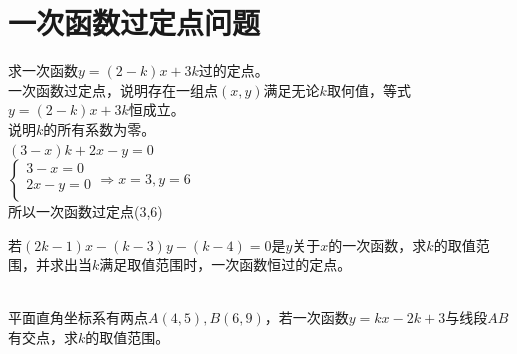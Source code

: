 \section{一次函数过定点问题}
\begin{example}
    求一次函数$y=(2-k)x+3k$过的定点。 \\
    一次函数过定点，说明存在一组点$(x,y)$满足无论$k$取何值，等式$y=(2-k)x+3k$恒成立。 \\
    说明$k$的所有系数为零。 \\
    $(3-x)k+2x-y=0$ \\
    $\begin{cases} 3-x=0 \\ 2x-y=0 \\ \end{cases} \Rightarrow x=3,y=6$ \\
    所以一次函数过定点(3,6)
\end{example}
\begin{problem}
若$(2k−1)x−(k−3)y−(k−4)=0$是$y$关于$x$的一次函数，求$k$的取值范围，并求出当$k$满足取值范围时，一次函数恒过的定点。\\
\\
\end{problem}
\begin{problem}
平面直角坐标系有两点$A(4,5),B(6,9)$，若一次函数$y=kx−2k+3$与线段$AB$有交点，求$k$的取值范围。\\
\\
\end{problem}
\clearpage
